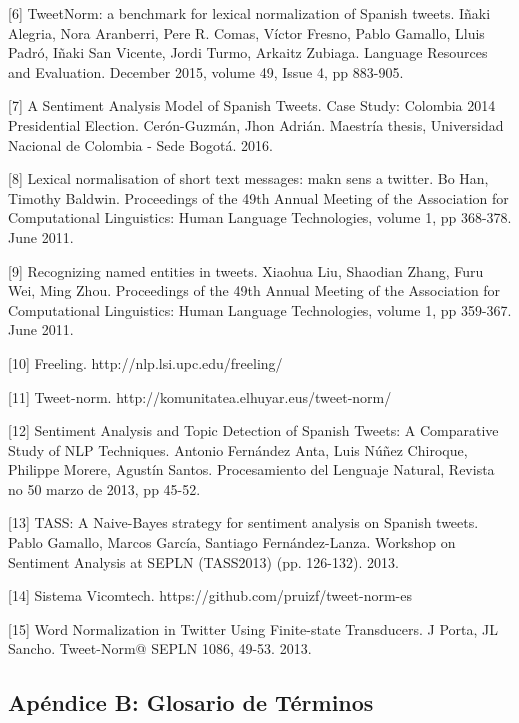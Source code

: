 \documentclass[14pt]{extarticle}
\theoremstyle{definition}
\theoremstyle{remark}
\begin{document}
[6] TweetNorm: a benchmark for lexical normalization of Spanish tweets. Iñaki Alegria, Nora Aranberri, Pere R. Comas, Víctor Fresno, Pablo Gamallo, Lluis Padró, Iñaki San Vicente, Jordi Turmo, Arkaitz Zubiaga. Language Resources and Evaluation. December 2015, volume 49, Issue 4, pp 883-905.

[7] A Sentiment Analysis Model of Spanish Tweets. Case Study: Colombia 2014 Presidential Election. Cerón-Guzmán, Jhon Adrián. Maestría thesis, Universidad Nacional de Colombia - Sede Bogotá. 2016.

[8] Lexical normalisation of short text messages: makn sens a twitter. Bo Han, Timothy Baldwin. Proceedings of the 49th Annual Meeting of the Association for Computational Linguistics: Human Language Technologies, volume 1, pp 368-378. June 2011.

[9] Recognizing named entities in tweets. Xiaohua Liu, Shaodian Zhang, Furu Wei, Ming Zhou. Proceedings of the 49th Annual Meeting of the Association for Computational Linguistics: Human Language Technologies, volume 1, pp 359-367. June 2011.

[10] Freeling. http://nlp.lsi.upc.edu/freeling/

[11] Tweet-norm. http://komunitatea.elhuyar.eus/tweet-norm/

[12] Sentiment Analysis and Topic Detection of Spanish Tweets: A Comparative Study of NLP Techniques. Antonio Fernández Anta, Luis Núñez Chiroque, Philippe Morere, Agustín Santos. Procesamiento del Lenguaje Natural, Revista no 50 marzo de 2013, pp 45-52.

[13] TASS: A Naive-Bayes strategy for sentiment analysis on Spanish tweets. Pablo Gamallo, Marcos García, Santiago Fernández-Lanza. Workshop on Sentiment Analysis at SEPLN (TASS2013) (pp. 126-132). 2013.

[14] Sistema Vicomtech. https://github.com/pruizf/tweet-norm-es

[15] Word Normalization in Twitter Using Finite-state Transducers. J Porta, JL Sancho. Tweet-Norm@ SEPLN 1086, 49-53. 2013.

\newpage
\subsection{Apéndice B: Glosario de Términos}\label{sec:glosariodeterminos}
\end{document}

